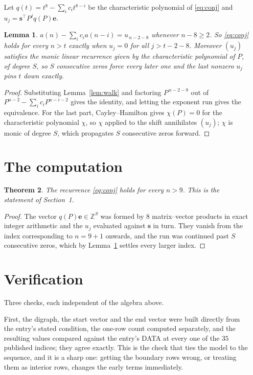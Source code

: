 \documentclass[11pt,a4paper]{article}
\theoremstyle{plain}
\newtheorem{theorem}{Theorem}
\newtheorem{lemma}[theorem]{Lemma}
\theoremstyle{definition}
\begin{document}
Let $q(t)=t^{8}-\sum_i c_i t^{8-i}$ be the characteristic polynomial of
\eqref{eq:conj} and $u_j=\mathbf{s}^{\!\top}P^{j}q(P)\mathbf{e}$.

\begin{lemma}\label{lem:crit}
$a(n)-\sum_i c_i a(n-i)=u_{\,n-2-8}$ whenever $n-8\ge2$. So \eqref{eq:conj}
holds for every $n>t$ exactly when $u_j=0$ for all $j>t-2-8$. Moreover $(u_j)$
satisfies the monic linear recurrence given by the characteristic polynomial of $P$, of
degree $S$, so $S$ consecutive zeros force every later one and the last nonzero $u_j$ pins
$t$ down exactly.
\end{lemma}

\begin{proof}
Substituting Lemma~\ref{lem:walk} and factoring $P^{\,n-2-8}$ out of
$P^{n-2}-\sum_i c_i P^{n-i-2}$ gives the identity, and letting the exponent run gives the
equivalence. For the last part, Cayley--Hamilton gives $\chi(P)=0$ for the characteristic
polynomial $\chi$, so $\chi$ applied to the shift annihilates $(u_j)$; $\chi$ is monic of
degree $S$, which propagates $S$ consecutive zeros forward.
\end{proof}

\section{The computation}

\begin{theorem}
The recurrence \eqref{eq:conj} holds for every $n>9$. This is the statement of
Section~1.
\end{theorem}

\begin{proof}
The vector $q(P)\mathbf{e}\in\mathbb{Z}^{S}$ was formed by $8$ matrix--vector
products in exact integer arithmetic and the $u_j$ evaluated against $\mathbf{s}$ in turn.
They vanish from the index corresponding to $n=9+1$ onwards, and the run was continued
past $S$ consecutive zeros, which by Lemma~\ref{lem:crit} settles every larger index.
\end{proof}

\section{Verification}

Three checks, each independent of the algebra above.

First, the digraph, the start vector and the end vector were built directly from the
entry's stated condition, the one-row count computed separately, and the resulting values
compared against the entry's DATA at every one of the $35$ published indices; they
agree exactly. This is the check that ties the model to the sequence, and it is a sharp one:
getting the boundary rows wrong, or treating them as interior rows, changes the early terms
immediately.
\end{document}
